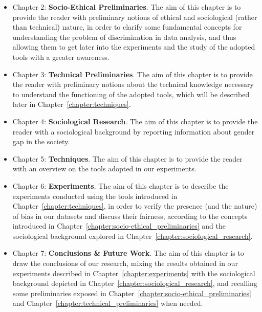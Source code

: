 \begin{itemize}
\item Chapter 2: \textbf{Socio-Ethical Preliminaries}. The aim of this chapter is to provide the reader with preliminary notions of ethical and sociological (rather than technical) nature, in order to clarify some fundamental concepts for understanding the problem of discrimination in data analysis, and thus allowing them to get later into the experiments and the study of the adopted tools with a greater awareness.
\item Chapter 3: \textbf{Technical Preliminaries}. The aim of this chapter is to provide the reader with preliminary notions about the technical knowledge necessary to understand the functioning of the adopted tools, which will be described later in Chapter~\ref{chapter:techniques}.
\item Chapter 4: \textbf{Sociological Research}. The aim of this chapter is to provide the reader with a sociological background by reporting information about gender gap in the society.
\item Chapter 5: \textbf{Techniques}. The aim of this chapter is to provide the reader with an overview on the tools adopted in our experiments.
\item Chapter 6: \textbf{Experiments}. The aim of this chapter is to describe the experiments conducted using the tools introduced in Chapter~\ref{chapter:techniques}, in order to verify the presence (and the nature) of bias in our datasets and discuss their fairness, according to the concepts introduced in Chapter~\ref{chapter:socio-ethical_preliminaries} and the sociological background explored in Chapter~\ref{chapter:sociological_research}.
\item Chapter 7: \textbf{Conclusions \& Future Work}. The aim of this chapter is to draw the conclusions of our research, mixing the results obtained in our experiments described in Chapter~\ref{chapter:experiments} with the sociological background depicted in Chapter~\ref{chapter:sociological_research}, and recalling some preliminaries exposed in Chapter~\ref{chapter:socio-ethical_preliminaries} and Chapter~\ref{chapter:technical_preliminaries} when needed.
\end{itemize}
